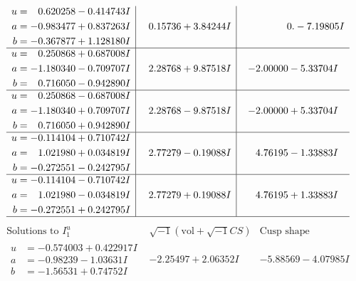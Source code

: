 \documentclass[1p]{elsarticle_modified}
\theoremstyle{definition}
\newcommand{\I}{\sqrt{-1}}
\begin{document}
$$\begin{array}{c|c|c}
\begin{aligned}
u &= \phantom{-}0.620258 - 0.414743 I \\
a &= -0.983477 + 0.837263 I \\
b &= -0.367877 + 1.128180 I\end{aligned}
 & \phantom{-}0.15736 + 3.84244 I & \phantom{-0.000000 } 0. - 7.19805 I \\ \hline\begin{aligned}
u &= \phantom{-}0.250868 + 0.687008 I \\
a &= -1.180340 - 0.709707 I \\
b &= \phantom{-}0.716050 - 0.942890 I\end{aligned}
 & \phantom{-}2.28768 + 9.87518 I & -2.00000 - 5.33704 I \\ \hline\begin{aligned}
u &= \phantom{-}0.250868 - 0.687008 I \\
a &= -1.180340 + 0.709707 I \\
b &= \phantom{-}0.716050 + 0.942890 I\end{aligned}
 & \phantom{-}2.28768 - 9.87518 I & -2.00000 + 5.33704 I \\ \hline\begin{aligned}
u &= -0.114104 + 0.710742 I \\
a &= \phantom{-}1.021980 + 0.034819 I \\
b &= -0.272551 - 0.242795 I\end{aligned}
 & \phantom{-}2.77279 - 0.19088 I & \phantom{-}4.76195 - 1.33883 I \\ \hline\begin{aligned}
u &= -0.114104 - 0.710742 I \\
a &= \phantom{-}1.021980 - 0.034819 I \\
b &= -0.272551 + 0.242795 I\end{aligned}
 & \phantom{-}2.77279 + 0.19088 I & \phantom{-}4.76195 + 1.33883 I\\
 \hline 
 \end{array}$$\newpage$$\begin{array}{c|c|c}  
\text{Solutions to }I^u_{1}& \I (\text{vol} + \sqrt{-1}CS) & \text{Cusp shape}\\
 \hline 
\begin{aligned}
u &= -0.574003 + 0.422917 I \\
a &= -0.98239 - 1.03631 I \\
b &= -1.56531 + 0.74752 I\end{aligned}
 & -2.25497 + 2.06352 I & -5.88569 - 4.07985 I \\ \hline\begin{aligned}

\end{aligned}
\end{array}$$
\end{document}
